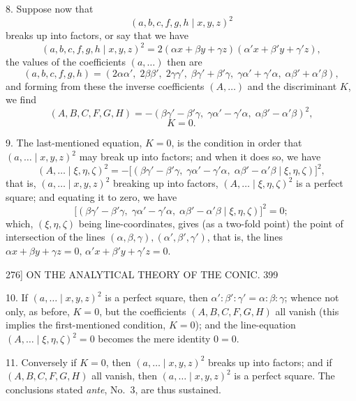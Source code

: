 \documentclass[11pt]{article}
\begin{document}
\textsc{8.} Suppose now that
\[ (a,b,c,f,g,h \mid x,y,z)^{2} \]
breaks up into factors, or say that we have
\[ (a,b,c,f,g,h \mid x,y,z)^{2}=2(\alpha x+\beta y+\gamma z)(\alpha' x+\beta' y+\gamma' z), \]
the values of the coefficients $(a,\dots)$ then are
\[ (a,b,c,f,g,h)=(2\alpha\alpha',\;2\beta\beta',\;2\gamma\gamma',\;\beta\gamma'+\beta'\gamma,\;\gamma\alpha'+\gamma'\alpha,\;\alpha\beta'+\alpha'\beta), \]
and forming from these the inverse coefficients $(A,\dots)$ and the discriminant $K$, we find
\[ (A,B,C,F,G,H)=-(\beta\gamma'-\beta'\gamma,\;\gamma\alpha'-\gamma'\alpha,\;\alpha\beta'-\alpha'\beta)^{2}, \]
\[ K=0. \]

\textsc{9.} The last-mentioned equation, $K=0$, is the condition in order that $(a,\dots \mid x,y,z)^{2}$
may break up into factors; and when it does so, we have
\[ (A,\dots \mid \xi,\eta,\zeta)^{2}=-\bigl[(\beta\gamma'-\beta'\gamma,\;\gamma\alpha'-\gamma'\alpha,\;\alpha\beta'-\alpha'\beta \mid \xi,\eta,\zeta)\bigr]^{2}, \]
that is, $(a,\dots \mid x,y,z)^{2}$ breaking up into factors, $(A,\dots \mid \xi,\eta,\zeta)^{2}$ is a perfect square; and
equating it to zero, we have
\[ \bigl[(\beta\gamma'-\beta'\gamma,\;\gamma\alpha'-\gamma'\alpha,\;\alpha\beta'-\alpha'\beta \mid \xi,\eta,\zeta)\bigr]^{2}=0; \]
which, $(\xi,\eta,\zeta)$ being line-coordinates, gives (as a two-fold point) the point of intersection
of the lines $(\alpha,\beta,\gamma),(\alpha',\beta',\gamma')$, that is, the lines $\alpha x+\beta y+\gamma z=0,\,\alpha'x+\beta'y+\gamma'z=0$.

\begin{center}
\textsc{276]} \hfill ON THE ANALYTICAL THEORY OF THE CONIC. \hfill 399
\end{center}

\textsc{10.} If $(a,\dots \mid x,y,z)^{2}$ is a perfect square, then $\alpha':\beta':\gamma'=\alpha:\beta:\gamma$; whence not only,
as before, $K=0$, but the coefficients $(A,B,C,F,G,H)$ all vanish (this implies the
first-mentioned condition, $K=0$); and the line-equation $(A,\dots \mid \xi,\eta,\zeta)^{2}=0$ becomes the
mere identity $0=0$.

\textsc{11.} Conversely if $K=0$, then $(a,\dots \mid x,y,z)^{2}$ breaks up into factors; and if
$(A,B,C,F,G,H)$ all vanish, then $(a,\dots \mid x,y,z)^{2}$ is a perfect square. The conclusions
stated \emph{ante}, No.~3, are thus sustained.
\end{document}
